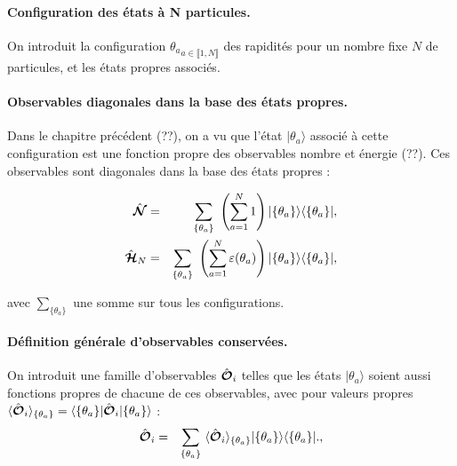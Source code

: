 \paragraph{Configuration des états à N particules.}
On introduit la configuration ${ \theta_a }_{a\in \llbracket 1 , N \rrbracket}$ des rapidités pour un nombre fixe $N$ de particules, et les états propres associés.

\paragraph{Observables diagonales dans la base des états propres.}
Dans le chapitre précédent (??), on a vu que l'état $\vert { \theta_a } \rangle$ associé à cette configuration est une fonction propre des observables nombre et énergie (??). Ces observables sont diagonales dans la base des états propres :

\begin{eqnarray}
	\operator{\mathcal{N}} & = & \sum_{ \{\theta_a\} }   \left ( \sum_{a = 1}^N  1 \right )  \vert \{ \theta_a\}\rangle	\langle \{ \theta_a \}\vert,\\
	\operator{\mathcal{H}}_N & = & \sum_{\{ \theta_a\}}  \left ( \sum_{a = 1}^N  \varepsilon ( \theta_a ) \right )   \vert \{ \theta_a\}\rangle	\langle \{ \theta_a \}\vert,		
\end{eqnarray}

avec $ \sum_{\{ \theta_a\}}$ une somme sur tous les configurations.\\


\paragraph{Définition générale d'observables conservées.}
On introduit une famille d'observables $\hat{\bm{\mathcal{O}}}_i$ telles que les états $\vert { \theta_a } \rangle$ soient aussi fonctions propres de chacune de ces observables, avec pour valeurs propres $\langle \hat{\bm{\mathcal{O}}}_i \rangle_{\{\theta_a \}} = \langle \{ \theta_a \} \vert\hat{\bm{\mathcal{O}}}_i \vert \{ \theta_a \} \rangle$ :\\

\begin{eqnarray}
	\operator{\mathcal{O}}_i & = & \sum_{ \{\theta_a\} }   \langle \operator{\mathcal{O}}_i \rangle_{\{\theta_a \}}  \vert \{ \theta_a\}\rangle	\langle \{ \theta_a \}\vert.,		
\end{eqnarray}


